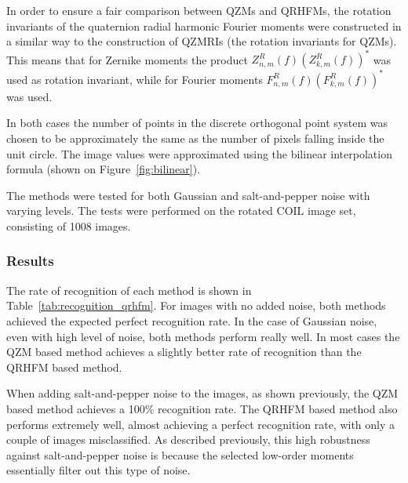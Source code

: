 In order to ensure a fair comparison between QZMs and QRHFMs, the rotation invariants of the quaternion radial harmonic Fourier moments were constructed in a similar way to the construction of QZMRIs (the rotation invariants for QZMs). This means that for Zernike moments the product $Z_{n,m}^R(f)(Z_{k,m}^R(f))^*$ was used as rotation invariant, while for Fourier moments $F_{n,m}^R(f)(F_{k,m}^R(f))^*$ was used.

In both cases the number of points in the discrete orthogonal point system was chosen to be approximately the same as the number of pixels falling inside the unit circle. The image values were approximated using the bilinear interpolation formula (shown on Figure~\ref{fig:bilinear}).

The methods were tested for both Gaussian and salt-and-pepper noise with varying levels. The tests were performed on the rotated COIL image set, consisting of 1008 images.

\subsubsection{Results}
The rate of recognition of each method is shown in Table~\ref{tab:recognition_qrhfm}.
For images with no added noise, both methods achieved the expected perfect recognition rate. In the case of Gaussian noise, even with high level of noise, both methods perform really well. In most cases the QZM based method achieves a slightly better rate of recognition than the QRHFM based method.

When adding salt-and-pepper noise to the images, as shown previously, the QZM based method achieves a 100\% recognition rate. The QRHFM based method also performs extremely well, almost achieving a perfect recognition rate, with only a couple of images misclassified. As described previously, this high robustness against salt-and-pepper noise is because the selected low-order moments essentially filter out this type of noise.

